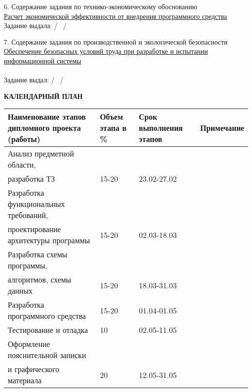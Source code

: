 {  \small{6. Содержание задания по технико-экономическому обоснованию} \\
  \uline{\small{Расчет экономической эффективности от внедрения программного средства}}\lineunderscore\\

  \small{Задание выдала: \uline{\hspace*{6em}} / \diplomaTaskEconConsultant~/}
  \vspace{1em}

  \small{7. Содержание задания по производственной и экологической безопасности} \\
  \uline{\small{Обеспечение безопасных условий труда при разработке и испытании информационной системы}}\lineunderscore\\
  \lineunderscore\\

  \small{Задание выдал:  \uline{\hspace*{6em}} / \diplomaTaskLaborProtectionConsultant~/}

  \begin{center}
    \textbf{\small{КАЛЕНДАРНЫЙ ПЛАН}}
  \end{center}

  \begin{tabular}{| >{}m{} 
                  | >{\centering}m{}
                  | >{\centering}m{}  
                  | >{\centering\arraybackslash}m{}|}
    \hline \small{Наименование этапов дипломного проекта (работы)} & \small{Объем этапа в \%} & \small{Срок выполнения этапов} & \small{Примечание} \\
    \hline \small{Анализ предметной области,} & & & \\
    \hline \small{разработка ТЗ} & \small{15-20} & \small{23.02-27.02} & \\
    \hline \small{Разработка функциональных требований,} & & & \\
    \hline \small{проектирование архитектуры программы } & \small{15-20} & \small{02.03-18.03} & \\
    \hline \small{Разработка схемы программы},& & & \\
    \hline \small{алгоритмов, схемы данных} & \small{15-20} & \small{18.03-31.03} & \\
    \hline \small{Разработка программного средства} & \small{15-20} & \small{01.04-01.05} & \\
    \hline \small{Тестирование и отладка} & \small{10} & \small{02.05-11.05} & \\
    \hline \small{Оформление пояснительной записки} & & & \\
    \hline \small{и графического материала} & \small{20} & \small{12.05-31.05} & \\
    \hline
  \end{tabular}

}
